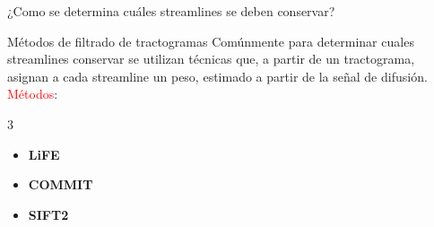 \documentclass[12pt, aspectratio=43]{beamer}
\begin{document}
\begin{frame}{}
    \centering
    \huge{¿Como se determina cuáles streamlines se deben conservar?}
\end{frame}

\begin{frame}{Métodos de filtrado de tractogramas}
    Comúnmente para determinar cuales streamlines conservar se utilizan técnicas que, a partir de un tractograma, asignan a cada streamline un peso, estimado a partir de la señal de difusión. \\

    \pause
    \vspace{0.5cm}
    {\large \textcolor{red}{Métodos}}:
    \begin{multicols}{3}
         \begin{itemize}
        \item \textbf{LiFE}%
        \item \textbf{COMMIT}%
        \item \textbf{SIFT2}%
    \end{itemize}
    \end{multicols}
\end{frame}

\end{document}
